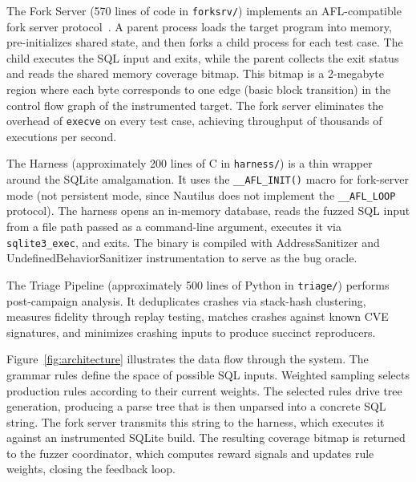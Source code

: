 The Fork Server (570 lines of code in \texttt{forksrv/}) implements an AFL-compatible fork server protocol~\cite{afl}. A parent process loads the target program into memory, pre-initializes shared state, and then forks a child process for each test case. The child executes the SQL input and exits, while the parent collects the exit status and reads the shared memory coverage bitmap. This bitmap is a 2-megabyte region where each byte corresponds to one edge (basic block transition) in the control flow graph of the instrumented target. The fork server eliminates the overhead of \texttt{execve} on every test case, achieving throughput of thousands of executions per second.

The Harness (approximately 200 lines of C in \texttt{harness/}) is a thin wrapper around the SQLite amalgamation. It uses the \texttt{\_\_AFL\_INIT()} macro for fork-server mode (not persistent mode, since Nautilus does not implement the \texttt{\_\_AFL\_LOOP} protocol). The harness opens an in-memory database, reads the fuzzed SQL input from a file path passed as a command-line argument, executes it via \texttt{sqlite3\_exec}, and exits. The binary is compiled with AddressSanitizer and UndefinedBehaviorSanitizer instrumentation to serve as the bug oracle.

The Triage Pipeline (approximately 500 lines of Python in \texttt{triage/}) performs post-campaign analysis. It deduplicates crashes via stack-hash clustering, measures fidelity through replay testing, matches crashes against known CVE signatures, and minimizes crashing inputs to produce succinct reproducers.

Figure~\ref{fig:architecture} illustrates the data flow through the system. The grammar rules define the space of possible SQL inputs. Weighted sampling selects production rules according to their current weights. The selected rules drive tree generation, producing a parse tree that is then unparsed into a concrete SQL string. The fork server transmits this string to the harness, which executes it against an instrumented SQLite build. The resulting coverage bitmap is returned to the fuzzer coordinator, which computes reward signals and updates rule weights, closing the feedback loop.


